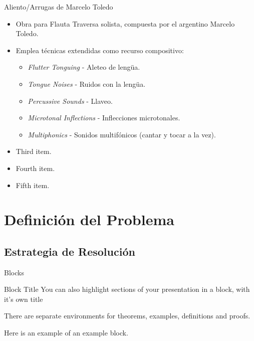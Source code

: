 \documentclass[aspectratio=169]{beamer}
\begin{document}
\begin{frame}{Aliento/Arrugas de Marcelo Toledo}
  \begin{itemize}
  \item {
    Obra para Flauta Traversa solista, compuesta por el argentino Marcelo Toledo.
  }
  \item {   
    Emplea técnicas extendidas como recurso compositivo:
    \begin{itemize}
    	\item \textit{Flutter Tonguing} - Aleteo de lengüa.
     	\item \textit{Tongue Noises} - Ruidos con la lengüa.
     	\item \textit{Percussive Sounds} - Llaveo.
     	\item \textit{Microtonal Inflections} - Inflecciones microtonales.
     	\item \textit{Multiphonics} - Sonidos multifónicos (cantar y tocar a la vez).
    \end{itemize}
  }
  \item {
    Third item.
  }
  \item {
    Fourth item.
  }
  \item {
    Fifth item. 
  }
  \end{itemize}
\end{frame}

\section{Definición del Problema}

\subsection{Estrategia de Resolución}

\begin{frame}{Blocks}
\begin{block}{Block Title}
You can also highlight sections of your presentation in a block, with it's own title
\end{block}
\begin{theorem}
There are separate environments for theorems, examples, definitions and proofs.
\end{theorem}
\begin{example}
Here is an example of an example block.
\end{example}
\end{frame}
\end{document}
